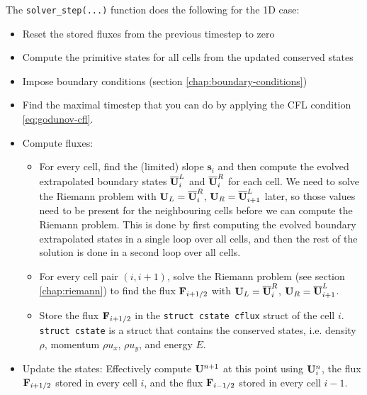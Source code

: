 The \verb|solver_step(...)| function does the following for the 1D case:
\begin{itemize}
	\item 	Reset the stored fluxes from the previous timestep to zero
	\item 	Compute the primitive states for all cells from the updated conserved states
	\item 	Impose boundary conditions (section \ref{chap:boundary-conditions})
	\item 	Find the maximal timestep that you can do by applying the CFL condition \ref{eq:godunov-cfl}.
	\item 	Compute fluxes:
	\begin{itemize}
		\item 	For every cell, find the (limited) slope $\mathbf{s}_i$ and then compute the evolved extrapolated boundary states $\overline{\mathbf{U}}_i^L$ and $\overline{\mathbf{U}}_i^R$ for each cell.
				We need to solve the Riemann problem with $\mathbf{U}_L = \overline{\mathbf{U}}_i^R$, $\mathbf{U}_R = \overline{\mathbf{U}}_{i+1}^L$ later, so those values need to be present for the neighbouring cells before we can compute the Riemann problem.
				This is done by first computing the evolved boundary extrapolated states in a single loop over all cells, and then the rest of the solution is done in a second loop over all cells.
		\item 	For every cell pair $(i, i+1)$, solve the Riemann problem (see section \ref{chap:riemann}) to find the flux $\mathbf{F}_{i+1/2}$ with $\mathbf{U}_L = \overline{\mathbf{U}}_i^R$, $\mathbf{U}_R = \overline{\mathbf{U}}_{i+1}^L$.
		\item 	Store the flux $\mathbf{F}_{i+1/2}$ in the \texttt{struct cstate cflux} struct of the cell $i$.
				\texttt{struct cstate} is a struct that contains the conserved states, i.e. density $\rho$, momentum $\rho u_x$, $\rho u_y$, and energy $E$.
	\end{itemize}
	\item 	Update the states: Effectively compute $\mathbf{U}^{n+1}$ at this point using $\mathbf{U}_i^n$, the flux $\mathbf{F}_{i+1/2}$ stored in every cell $i$, and the flux $\mathbf{F}_{i-1/2}$ stored in every cell $i-1$.
\end{itemize}
